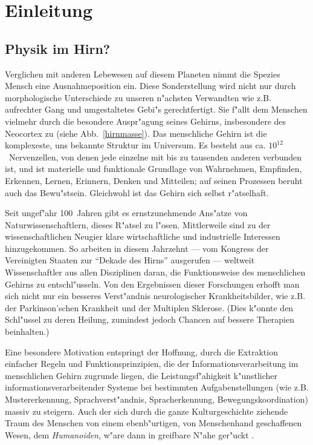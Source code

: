 \section{Einleitung}
\label{einleitung}
\thispagestyle{plain}

\subsection{Physik im Hirn?} 

Verglichen mit anderen Lebewesen auf diesem Planeten nimmt die Spezies
Mensch eine Ausnahmeposition ein.  Diese Sonderstellung wird nicht nur
durch morphologische Unterschiede zu unseren n"achsten Verwandten wie
z.B. aufrechter Gang und umgestaltetes Gebi"s gerechtfertigt. Sie f"allt
dem Menschen vielmehr durch die besondere Auspr"agung seines Gehirns,
insbesondere des Neocortex zu (siehe Abb.~\ref{hirnmasse}).  Das
menschliche Gehirn ist die komplexeste, uns bekannte Struktur im Universum.
Es besteht aus ca. $10^{12}$~Nervenzellen, von denen jede einzelne mit bis
zu tausenden anderen verbunden ist, und ist materielle und funktionale
Grundlage von Wahrnehmen, Empfinden, Erkennen, Lernen, Erinnern, Denken und
Mitteilen; auf seinen Prozessen beruht auch das Bewu"stsein. Gleichwohl ist
das Gehirn sich selbst r"atselhaft.

Seit ungef"ahr 100~Jahren gibt es ernstzunehmende Ans"atze von
Naturwissenschaftlern, dieses R"atsel zu l"osen.  Mittlerweile sind zu der
wissenschaftlichen Neugier klare wirtschaftliche und industrielle
Interessen hinzugekommen. So arbeiten in diesem Jahrzehnt --- vom Kongress
der Vereinigten Staaten zur ``Dekade des Hirns'' ausgerufen --- weltweit
Wissenschaftler aus allen Disziplinen daran, die Funktionsweise des
menschlichen Gehirns zu entschl"usseln. Von den Ergebnissen dieser
Forschungen erhofft man sich nicht nur ein besseres Verst"andnis
neurologischer Krankheitsbilder, wie z.B. der Parkinson'schen Krankheit und
der Multiplen Sklerose. (Dies k"onnte den Schl"ussel zu deren Heilung,
zumindest jedoch Chancen auf bessere Therapien beinhalten.)

Eine besondere Motivation entspringt der Hoffnung, durch die Extraktion
einfacher Regeln und Funktionsprinzipien, die der Informationsverarbeitung
im menschlichen Gehirn zugrunde liegen, die Leistungsf"ahigkeit
k"unstlicher informationsverarbeitender Systeme bei bestimmten
Aufgabenstellungen (wie z.B. Mustererkennung, Sprachverst"andnis,
Spracherkennung, Bewegungskoordination) massiv zu steigern. Auch der sich
durch die ganze Kulturgeschichte ziehende Traum des Menschen von einem
ebenb"urtigen, von Menschenhand geschaffenen Wesen, dem \emph{Humanoiden},
w"are dann in greifbare N"ahe ger"uckt .

